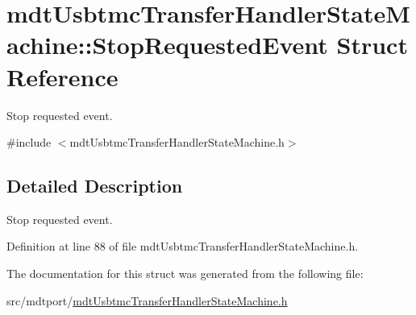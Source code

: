 \hypertarget{structmdt_usbtmc_transfer_handler_state_machine_1_1_stop_requested_event}{\section{mdt\-Usbtmc\-Transfer\-Handler\-State\-Machine\-:\-:Stop\-Requested\-Event Struct Reference}
\label{structmdt_usbtmc_transfer_handler_state_machine_1_1_stop_requested_event}
}


Stop requested event.  




{\ttfamily \#include $<$mdt\-Usbtmc\-Transfer\-Handler\-State\-Machine.\-h$>$}



\subsection{Detailed Description}
Stop requested event. 

Definition at line 88 of file mdt\-Usbtmc\-Transfer\-Handler\-State\-Machine.\-h.



The documentation for this struct was generated from the following file\-:\begin{DoxyCompactItemize}
\item 
src/mdtport/\hyperlink{mdt_usbtmc_transfer_handler_state_machine_8h}{mdt\-Usbtmc\-Transfer\-Handler\-State\-Machine.\-h}\end{DoxyCompactItemize}

